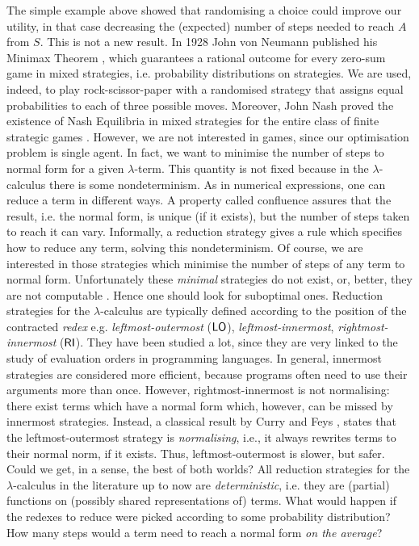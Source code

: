 The simple example above showed that randomising a choice could improve our utility, in that case decreasing the (expected) number of steps needed to reach $A$ from $S$. This is not a new result. In 1928 John von Neumann published his Minimax Theorem \cite{}, which guarantees a rational outcome for every zero-sum game in mixed strategies, i.e. probability distributions on strategies. We are used, indeed, to play rock-scissor-paper with a randomised strategy that assigns equal probabilities to each of three possible moves. Moreover, John Nash proved the existence of Nash Equilibria in mixed strategies for the entire class of finite strategic games \cite{}. However, we are not interested in games, since our optimisation problem is single agent. In fact, we want to minimise the number of steps to normal form for a given $\lambda$-term. This quantity is not fixed because in the $\lambda$-calculus there is some nondeterminism. As in numerical expressions, one can reduce a term in different ways. A property called confluence assures that the result, i.e. the normal form, is unique (if it exists), but the number of steps taken to reach it can vary. Informally, a reduction strategy gives a rule which specifies how to reduce any term, solving this nondeterminism. Of course, we are interested in those strategies which minimise the number of steps of any term to normal form. Unfortunately these \emph{minimal} strategies do not exist, or, better, they are not computable \cite{barendregt_lambda_1984}. Hence one should look for suboptimal ones. Reduction strategies for
the $\lambda$-calculus are typically defined according to the position
of the contracted \emph{redex} e.g. \emph{leftmost-outermost} ($\textsf{LO}$),
\emph{leftmost-innermost}, \emph{rightmost-innermost} ($\textsf{RI}$). They have been studied a lot, since they are very linked to the study of evaluation orders in programming languages.
In general, innermost strategies are considered more efficient, because
programs often need to use their arguments more than once. However, rightmost-innermost is not normalising: there
exist terms which have a normal form which, however, can be missed by
innermost strategies. Instead, a classical result by Curry and Feys
\cite{curry_combinatory_1958}, states that the leftmost-outermost strategy is
\emph{normalising}, i.e., it always rewrites terms to their normal
norm, if it exists. Thus, leftmost-outermost is slower, but
safer. Could we get, in a sense, the best of both worlds?  All
reduction strategies for the $\lambda$-calculus in the literature up
to now are \emph{deterministic}, i.e. they are (partial) functions on
(possibly shared representations of) terms. What would
happen if the redexes to reduce were picked according to some
probability distribution? How many steps would a term need to reach a
normal form \emph{on the average}?
